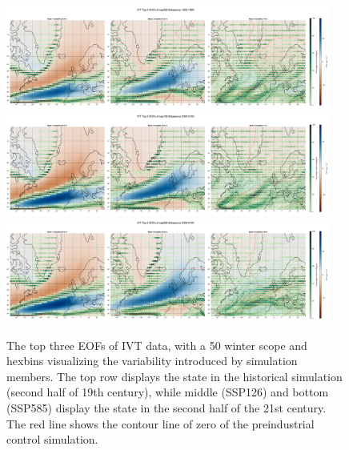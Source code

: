 \begin{figure}
  \begin{center}
    \includegraphics[width=0.95\textwidth]{figures/ivt_spat_patterns_hexbin_18501899_ssp585_50seasons.png}
    \includegraphics[width=0.95\textwidth]{figures/ivt_spat_patterns_hexbin_20502100_ssp126_50seasons.png}
    \includegraphics[width=0.95\textwidth]{figures/ivt_spat_patterns_hexbin_20502100_ssp585_50seasons.png}
  \end{center}
  \caption{The top three EOFs of IVT data, with a 50 winter scope and hexbins visualizing the variability introduced by simulation members. The top row displays the state in the historical simulation (second half of 19th century), while middle (SSP126) and bottom (SSP585) display the state in the second half of the 21st century. The red line shows the contour line of zero of the preindustrial control simulation. }\label{fig:ivt eof evolution}
\end{figure}



